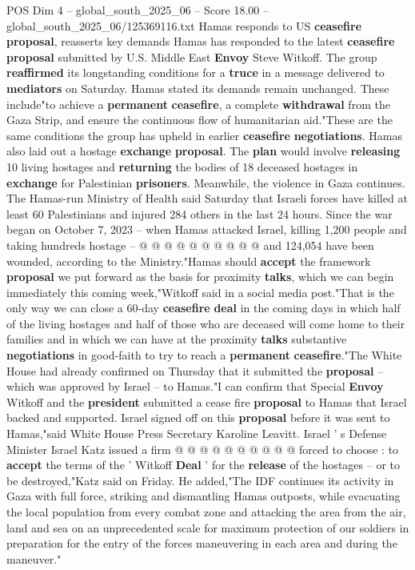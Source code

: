 \begin{textsample}{POS Dim 4 – global\_south\_2025\_06 – Score 18.00 – global\_south\_2025\_06/125369116.txt}  \label{ex:f4_pos_360}
Hamas responds to US \textbf{ceasefire} \textbf{proposal}, reasserts key demands Hamas has responded to the latest \textbf{ceasefire} \textbf{proposal} submitted by U.S.
Middle East \textbf{Envoy} Steve Witkoff.
The group \textbf{reaffirmed} its longstanding conditions for a \textbf{truce} in a message delivered to \textbf{mediators} on Saturday.
Hamas stated its demands remain unchanged.
These include"to achieve a \textbf{permanent} \textbf{ceasefire}, a complete \textbf{withdrawal} from the Gaza Strip, and ensure the continuous flow of humanitarian aid."These are the same conditions the group has upheld in earlier \textbf{ceasefire} \textbf{negotiations}.
Hamas also laid out a hostage \textbf{exchange} \textbf{proposal}.
The \textbf{plan} would involve \textbf{releasing} 10 living hostages and \textbf{returning} the bodies of 18 deceased hostages in \textbf{exchange} for Palestinian \textbf{prisoners}.
Meanwhile, the violence in Gaza continues.
The Hamas-run Ministry of Health said Saturday that Israeli forces have killed at least 60 Palestinians and injured 284 others in the last 24 hours.
Since the war began on October 7, 2023 -- when Hamas attacked Israel, killing 1,200 people and taking hundreds hostage -- @ @ @ @ @ @ @ @ @ @ and 124,054 have been wounded, according to the Ministry."Hamas should \textbf{accept} the framework \textbf{proposal} we put forward as the basis for proximity \textbf{talks}, which we can begin immediately this coming week,"Witkoff said in a social media post."That is the only way we can close a 60-day \textbf{ceasefire} \textbf{deal} in the coming days in which half of the living hostages and half of those who are deceased will come home to their families and in which we can have at the proximity \textbf{talks} substantive \textbf{negotiations} in good-faith to try to reach a \textbf{permanent} \textbf{ceasefire}."The White House had already confirmed on Thursday that it submitted the \textbf{proposal} -- which was approved by Israel -- to Hamas."I can confirm that Special \textbf{Envoy} Witkoff and the \textbf{president} submitted a cease fire \textbf{proposal} to Hamas that Israel backed and supported.
Israel signed off on this \textbf{proposal} before it was sent to Hamas,"said White House Press Secretary Karoline Leavitt.
Israel ' s Defense Minister Israel Katz issued a firm @ @ @ @ @ @ @ @ @ @ forced to choose : to \textbf{accept} the terms of the ' Witkoff \textbf{Deal} ' for the \textbf{release} of the hostages -- or to be destroyed,"Katz said on Friday.
He added,"The IDF continues its activity in Gaza with full force, striking and dismantling Hamas outposts, while evacuating the local population from every combat zone and attacking the area from the air, land and sea on an unprecedented scale for maximum protection of our soldiers in preparation for the entry of the forces maneuvering in each area and during the maneuver."

\end{textsample}
